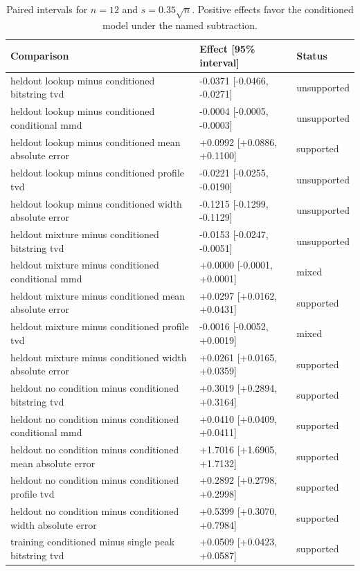 \begin{table}[p]
\centering
\scriptsize
\setlength{\tabcolsep}{4pt}
\caption{Paired intervals for $n=12$ and $s=0.35\sqrt n$. Positive effects favor the conditioned model under the named subtraction.}
\label{tab:all-intervals-n12-w0.35}
\begin{tabular}{@{}p{}p{}p{}@{}}
\toprule
Comparison & Effect [95\% interval] & Status\\
\midrule
heldout lookup minus conditioned bitstring tvd & -0.0371 [-0.0466, -0.0271] & unsupported \\
heldout lookup minus conditioned conditional mmd & -0.0004 [-0.0005, -0.0003] & unsupported \\
heldout lookup minus conditioned mean absolute error & +0.0992 [+0.0886, +0.1100] & supported \\
heldout lookup minus conditioned profile tvd & -0.0221 [-0.0255, -0.0190] & unsupported \\
heldout lookup minus conditioned width absolute error & -0.1215 [-0.1299, -0.1129] & unsupported \\
heldout mixture minus conditioned bitstring tvd & -0.0153 [-0.0247, -0.0051] & unsupported \\
heldout mixture minus conditioned conditional mmd & +0.0000 [-0.0001, +0.0001] & mixed \\
heldout mixture minus conditioned mean absolute error & +0.0297 [+0.0162, +0.0431] & supported \\
heldout mixture minus conditioned profile tvd & -0.0016 [-0.0052, +0.0019] & mixed \\
heldout mixture minus conditioned width absolute error & +0.0261 [+0.0165, +0.0359] & supported \\
heldout no condition minus conditioned bitstring tvd & +0.3019 [+0.2894, +0.3164] & supported \\
heldout no condition minus conditioned conditional mmd & +0.0410 [+0.0409, +0.0411] & supported \\
heldout no condition minus conditioned mean absolute error & +1.7016 [+1.6905, +1.7132] & supported \\
heldout no condition minus conditioned profile tvd & +0.2892 [+0.2798, +0.2998] & supported \\
heldout no condition minus conditioned width absolute error & +0.5399 [+0.3070, +0.7984] & supported \\
training conditioned minus single peak bitstring tvd & +0.0509 [+0.0423, +0.0587] & supported \\

\end{tabular}
\end{table}
